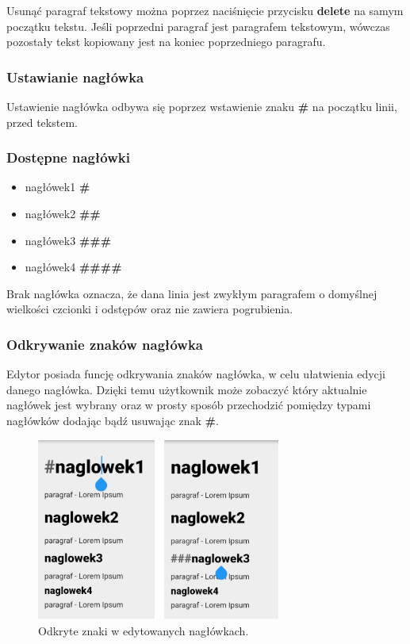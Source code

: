 Usunąć paragraf tekstowy można poprzez naciśnięcie przycisku \textbf{delete} na samym początku tekstu. Jeśli poprzedni paragraf jest paragrafem tekstowym, wówczas pozostały tekst kopiowany jest na koniec poprzedniego paragrafu.

\subsubsection{Ustawianie nagłówka}

Ustawienie nagłówka odbywa się poprzez wstawienie znaku \textbf{\#} na początku linii, przed tekstem.

\subsubsection{Dostępne nagłówki}
\begin{itemize}
    \setlength\itemsep{0mm}
    \item nagłówek1 \textbf{\#}
    \item nagłówek2 \textbf{\#\#}
    \item nagłówek3 \textbf{\#\#\#}
    \item nagłówek4 \textbf{\#\#\#\#}
\end{itemize}

Brak nagłówka oznacza, że dana linia jest zwykłym paragrafem o domyślnej wielkości czcionki i odstępów oraz nie zawiera pogrubienia.


\subsubsection{Odkrywanie znaków nagłówka}

Edytor posiada funcję odkrywania znaków nagłówka, w celu ułatwienia edycji danego nagłówka. Dzięki temu użytkownik może zobaczyć który aktualnie nagłówek jest wybrany oraz w prosty sposób przechodzić pomiędzy typami nagłówków dodając bądź usuwając znak \textbf{\#}.


\begin{figure}[ht]
    \centering
    \includegraphics[height=6cm]{images/pokazywanie_naglowkow.png}
    \caption{Odkryte znaki w edytowanych nagłówkach.}
\end{figure}

